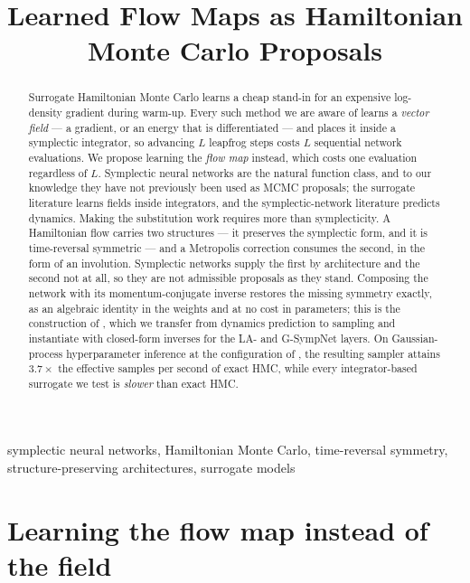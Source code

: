\documentclass[mlabstract,onecolumn]{jmlr}
\title[Flow-Map Surrogates for HMC]{Learned Flow Maps as Hamiltonian Monte Carlo
Proposals}
\begin{document}
\maketitle

\begin{abstract}
Surrogate Hamiltonian Monte Carlo learns a cheap stand-in for an expensive
log-density gradient during warm-up. Every such method we are aware of learns a
\emph{vector field} --- a gradient, or an energy that is differentiated --- and
places it inside a symplectic integrator, so advancing $L$ leapfrog steps costs
$L$ sequential network evaluations. We propose learning the \emph{flow map}
instead, which costs one evaluation regardless of $L$. Symplectic neural
networks are the natural function class, and to our knowledge they have not
previously been used as MCMC proposals; the surrogate literature learns fields
inside integrators, and the symplectic-network literature predicts dynamics.
Making the substitution work requires more than symplecticity. A Hamiltonian
flow carries two structures --- it preserves the symplectic form, and it is
time-reversal symmetric --- and a Metropolis correction consumes the second, in
the form of an involution. Symplectic networks supply the first by architecture
and the second not at all, so they are not
admissible proposals as they stand. Composing the network with its
momentum-conjugate inverse restores the missing symmetry exactly, as an
algebraic identity in the weights and at no cost in parameters; this is the
construction of \citet{valperga2022reversible}, which we transfer from dynamics
prediction to sampling and instantiate with closed-form inverses for the LA- and
G-SympNet layers. On
Gaussian-process hyperparameter inference at the configuration of
\citet{Li_2019}, the resulting sampler attains $3.7\times$ the effective samples
per second of exact HMC, while every integrator-based surrogate we test is
\emph{slower} than exact HMC. 
\end{abstract}

\begin{keywords}
symplectic neural networks, Hamiltonian Monte Carlo, time-reversal symmetry,
structure-preserving architectures, surrogate models
\end{keywords}

\section{Learning the flow map instead of the field}
\end{document}
